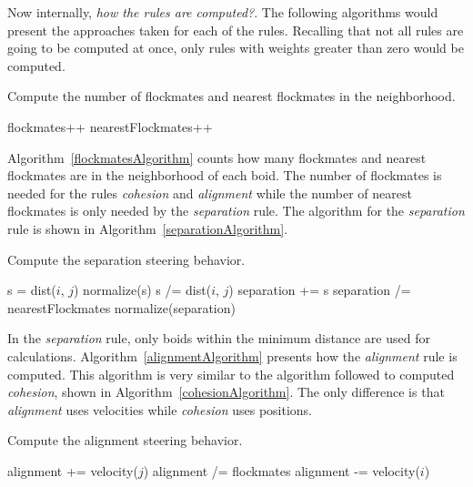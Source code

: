 Now internally, \textit{how the rules are computed?}. The following algorithms would present the approaches taken for each of the rules. Recalling that not all rules are going to be computed at once, only rules with weights greater than zero would be computed.


\begin{algorithm}
\caption{Compute the number of flockmates and nearest flockmates in the neighborhood.}
\label{flockmatesAlgorithm}
\begin{algorithmic}
\STATE flockmates++
\STATE nearestFlockmates++
\ENDIF
\ENDIF
\ENDFOR
\end{algorithmic}
\end{algorithm}

Algorithm~\ref{flockmatesAlgorithm} counts how many flockmates and nearest flockmates are in the neighborhood of each boid. The number of flockmates is needed for the rules \textit{cohesion} and \textit{alignment} while the number of nearest flockmates is only needed by the \textit{separation} rule. The algorithm for the \textit{separation} rule is shown in Algorithm~\ref{separationAlgorithm}.


\begin{algorithm}
\caption{Compute the separation steering behavior.}
\label{separationAlgorithm}
\begin{algorithmic}
\STATE s = dist($i$, $j$) 
\STATE normalize(s)
\STATE s /= dist($i$, $j$) 
\STATE separation += s
\ENDIF
\ENDFOR
{}
\STATE separation /= nearestFlockmates
\STATE normalize(separation)
\ENDIF
\end{algorithmic}
\end{algorithm}

In the \textit{separation} rule, only boids within the minimum distance are used for calculations. Algorithm~\ref{alignmentAlgorithm} presents how the \textit{alignment} rule is computed. This algorithm is very similar to the algorithm followed to computed \textit{cohesion}, shown in Algorithm~\ref{cohesionAlgorithm}. The only difference is that \textit{alignment} uses velocities while \textit{cohesion} uses positions.


\begin{algorithm}
\caption{Compute the alignment steering behavior.}
\label{alignmentAlgorithm}
\begin{algorithmic}
\STATE alignment += velocity($j$)
\ENDIF
\ENDFOR
{}
\STATE alignment /=  flockmates
\ENDIF
\STATE alignment -= velocity($i$)
\end{algorithmic}
\end{algorithm}

